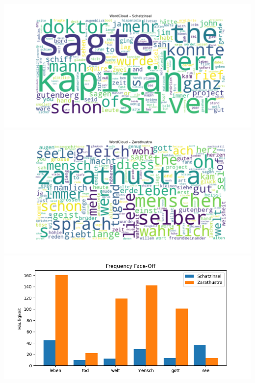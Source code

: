 \documentclass{scrartcl}
\begin{document}
\includegraphics*[scale=0.5]{SchatzinselWordcloudpy.png}\\
\includegraphics*[scale=0.5]{zarathustraWordcloudpy.png}\\
\includegraphics*[scale=0.5]{Ffo.png}\\
\end{document}
